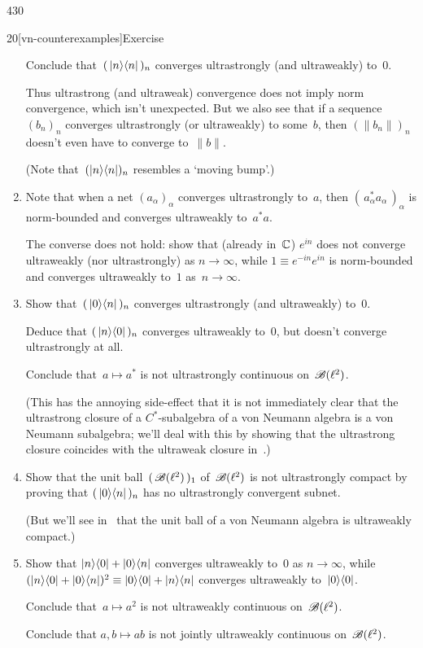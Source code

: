 \begin{parsec}{430}
\begin{point}{20}[vn-counterexamples]{Exercise}
\begin{enumerate}
Conclude that~$(\,\left|n\right>\!\left<n\right|\,)_n$
converges ultrastrongly (and ultraweakly) to~$0$.

Thus ultrastrong (and ultraweak) convergence does not imply norm convergence,
which isn't unexpected.
But we also see that if a sequence~$(b_n)_n$ converges ultrastrongly
(or ultraweakly) to some~$b$,
then $(\|b_n\|)_n$ doesn't even have to converge to~$\|b\|$.

(Note that~$(\left|n\right>\!\left<n\right|)_n$ resembles a `moving bump'.)
\item
Note that when a net $(a_\alpha)_\alpha$
converges ultrastrongly to~$a$,
then $(\,a_\alpha^*a_\alpha\,)_\alpha$
is norm-bounded and
converges ultraweakly to~$a^*a$.

The converse does not hold:
show that (already in~$\mathbb{C}$)
$e^{in}$
does not converge ultraweakly 
(nor ultrastrongly) as $n\to \infty$,
while $1\equiv e^{-in} e^{in}$
is norm-bounded and
converges ultraweakly to~$1$ as~$n\to\infty$.
\item
\label{vn-counterexamples-4}
Show that~$(\,\left|0\right>\!\left<n\right|\,)_n$ converges ultrastrongly 
(and ultraweakly) to~$0$.

Deduce that $(\,\left|n\right>\!\left<0\right|\,)_n$ converges ultraweakly to~$0$,
but doesn't converge ultrastrongly at all.

Conclude that~$a\mapsto a^*$ is not ultrastrongly continuous 
on~$\mathscr{B}(\ell^2)$.

(This has the annoying side-effect
that it is not immediately clear that the ultrastrong
closure of a $C^*$-subalgebra of a von Neumann algebra 
is a von Neumann subalgebra; we'll deal with this
by showing that the ultrastrong closure coincides
with the ultraweak closure in~.)
\item
Show that the unit ball~$(\,\mathscr{B}(\ell^2)\,)_1$
of~$\mathscr{B}(\ell^2)$ is not ultrastrongly compact
by proving that $(\,\left|0\right>\!\left<n\right|\,)_n$
has no ultrastrongly convergent subnet.

(But we'll see in~ that
the unit ball of a von Neumann algebra
is ultraweakly compact.)

\item
\label{vn-counterexamples-6}
Show that $\left|n\right>\!\left<0\right|+\left|0\right>\!\left<n\right|$
converges ultraweakly to~$0$ as $n\to \infty$,
while $(\left|n\right>\!\left<0\right|+\left|0\right>\!\left<n\right|)^2\equiv \left|0\right>\!\left<0\right|+\left|n\right>\!\left<n\right|$
converges ultraweakly to~$\left|0\right>\!\left<0\right|$.

Conclude that~$a\mapsto a^2$ is not ultraweakly continuous on~$\mathscr{B}(\ell^2)$.

Conclude that $a,b\mapsto ab$ is not jointly ultraweakly continuous
on~$\mathscr{B}(\ell^2)$.


\end{enumerate}
\end{point}
\end{parsec}
